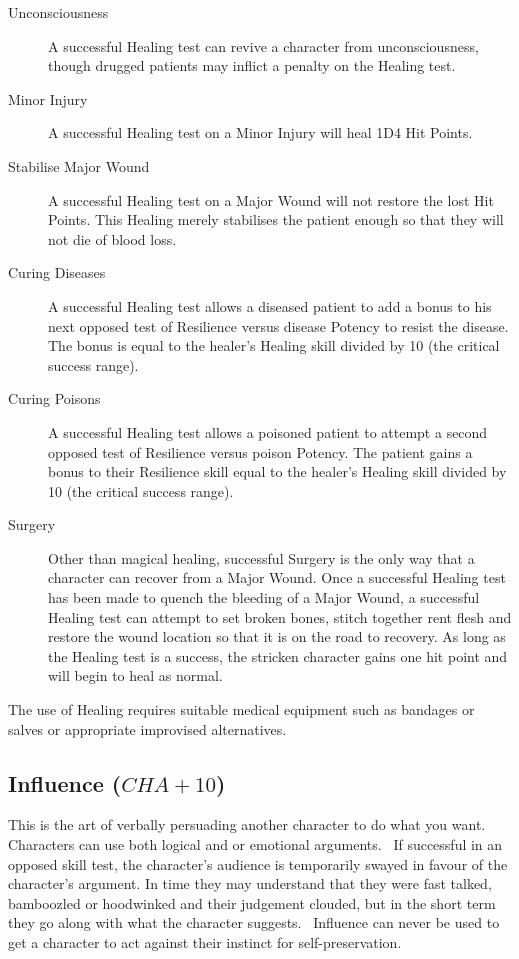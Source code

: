 \begin{description}
\item[Unconsciousness] A successful Healing test can revive a character from unconsciousness, though drugged patients may inflict a penalty on the Healing test.
\item[Minor Injury] A successful Healing test on a Minor Injury will heal 1D4 Hit Points. 
\item[Stabilise Major Wound] A successful Healing test on a Major Wound will not restore the lost Hit Points. This Healing merely stabilises the patient enough so that they will not die of blood loss.
\item[Curing Diseases] A successful Healing test allows a diseased patient to add a bonus to his next opposed test of Resilience versus disease Potency to resist the disease. The bonus is equal to the healer’s Healing skill divided by 10 (the critical success range).
\item[Curing Poisons] A successful Healing test allows a poisoned patient to attempt a second opposed test of Resilience versus poison Potency. The patient gains a bonus to their Resilience skill equal to the healer’s Healing skill divided by 10 (the critical success range).
\item[Surgery] Other than magical healing, successful Surgery is the only way that a character can recover from a Major Wound. Once a successful Healing test has been made to quench the bleeding of a Major Wound, a successful Healing test can attempt to set broken bones, stitch together rent flesh and restore the wound location so that it is on the road to recovery. As long as the Healing test is a success, the stricken character gains one hit point and will begin to heal as normal.
\end{description}

The use of Healing requires suitable medical equipment such as bandages or salves or appropriate improvised alternatives. 


\subsection{Influence ($CHA+10$)}
This is the art of verbally persuading another character to do what you want. Characters can use both logical and or emotional arguments.  If successful in an opposed skill test, the character’s audience is temporarily swayed in favour of the character’s argument. In time they may understand that they were fast talked, bamboozled or hoodwinked and their judgement clouded, but in the short term they go along with what the character suggests.  Influence can never be used to get a character to act against their instinct for self-preservation.

